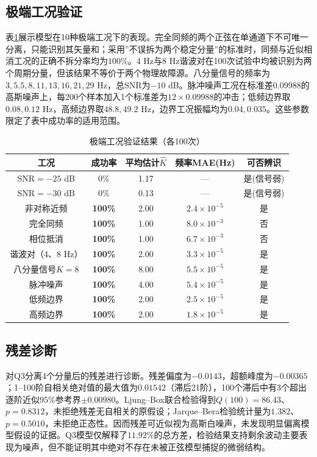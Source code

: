 \documentclass[withoutpreface,bwprint]{cumcmthesis}
\begin{document}
\subsection{极端工况验证}
表\ref{tab:q3_extreme}展示模型在10种极端工况下的表现。完全同频的两个正弦在单通道下不可唯一分离，只能识别其矢量和；采用”不误拆为两个稳定分量”的标准时，同频与近似相消工况的正确不拆分率均为$100\%$。4 Hz与8 Hz谐波对在100次试验中均被识别为两个周期分量，但该结果不等价于两个物理故障源。八分量信号的频率为$3,5.5,8,11,13,16,21,29$ Hz，总SNR为$-10$ dB。脉冲噪声工况在标准差$0.09988$的高斯噪声上，每200个样本加入1个标准差为$12\times0.09988$的冲击；低频边界取$0.08,0.12$ Hz，高频边界取$48.8,49.2$ Hz，边界工况振幅均为$0.04,0.035$。这些参数限定了表中成功率的适用范围。

\begin{longtable}{ccccc}
    \caption{极端工况验证结果（各100次）}\label{tab:q3_extreme}\\
    \toprule
    工况 & 成功率 & 平均估计$\hat{K}$ & 频率MAE(Hz) & 可否辨识 \\
    \midrule
    SNR$=-25$ dB & 0\% & 1.17 & — & 是(信号弱) \\
    SNR$=-30$ dB & 0\% & 0.13 & — & 是(信号弱) \\
    非对称近频 & \textbf{100\%} & 2.00 & $2.4\times10^{-5}$ & 是 \\
    完全同频 & \textbf{100\%} & 1.00 & $8.0\times10^{-3}$ & 否 \\
    相位抵消 & \textbf{100\%} & 1.00 & $6.7\times10^{-3}$ & 否 \\
    谐波对（4、8 Hz） & \textbf{100\%} & 2.00 & $3.3\times10^{-5}$ & 是 \\
    八分量信号$K=8$ & \textbf{100\%} & 8.00 & $5.5\times10^{-5}$ & 是 \\
    脉冲噪声 & \textbf{100\%} & 4.00 & $5.4\times10^{-5}$ & 是 \\
    低频边界 & \textbf{100\%} & 2.00 & $2.5\times10^{-5}$ & 是 \\
    高频边界 & \textbf{100\%} & 2.00 & $1.8\times10^{-5}$ & 是 \\
    \bottomrule
\end{longtable}

\subsection{残差诊断}
对Q3分离4个分量后的残差进行诊断。残差偏度为$-0.0143$，超额峰度为$-0.00365$；1--100阶自相关绝对值的最大值为$0.01542$（滞后21阶），100个滞后中有3个超出逐阶近似$95\%$参考界$\pm0.00980$。Ljung--Box联合检验得到$Q(100)=86.43$、$p=0.8312$，未拒绝残差无自相关的原假设；Jarque--Bera检验统计量为$1.382$、$p=0.5010$，未拒绝正态性。因而残差可近似视为高斯白噪声，未发现明显偏离模型假设的证据。Q3模型仅解释了$11.92\%$的总方差，检验结果支持剩余波动主要表现为噪声，但不能证明其中绝对不存在未被正弦模型捕捉的微弱结构。
\end{document}
